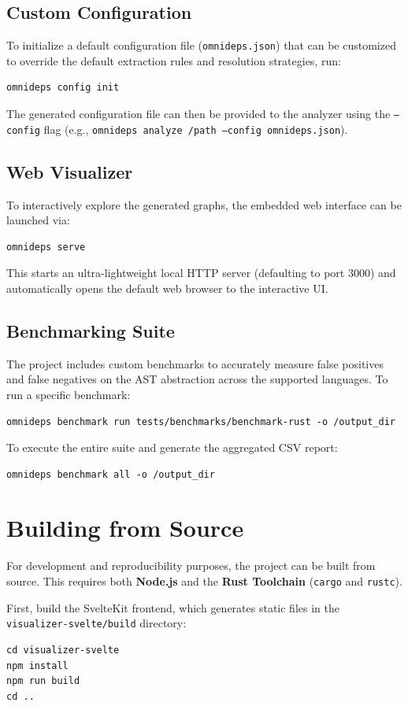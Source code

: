 \subsection*{Custom Configuration}
To initialize a default configuration file (\texttt{omnideps.json})
that can be customized to override the default extraction rules and
resolution strategies, run:
\begin{verbatim}
omnideps config init
\end{verbatim}
The generated configuration file can then be provided to the analyzer
using the \texttt{--config} flag (e.g., \texttt{omnideps analyze
/path --config omnideps.json}).

\subsection*{Web Visualizer}
To interactively explore the generated graphs, the embedded web
interface can be launched via:
\begin{verbatim}
omnideps serve
\end{verbatim}
This starts an ultra-lightweight local HTTP server (defaulting to
port 3000) and automatically opens the default web browser to the
interactive UI.

\subsection*{Benchmarking Suite}
The project includes custom benchmarks to accurately measure false
positives and false negatives on the AST abstraction across the
supported languages.
To run a specific benchmark:
\begin{verbatim}
omnideps benchmark run tests/benchmarks/benchmark-rust -o /output_dir
\end{verbatim}
To execute the entire suite and generate the aggregated CSV report:
\begin{verbatim}
omnideps benchmark all -o /output_dir
\end{verbatim}

\section{Building from Source}
For development and reproducibility purposes, the project can be
built from source. This requires both \textbf{Node.js} and the
\textbf{Rust Toolchain} (\texttt{cargo} and \texttt{rustc}).

First, build the SvelteKit frontend, which generates static files in
the \texttt{visualizer-svelte/build} directory:
\begin{verbatim}
cd visualizer-svelte
npm install
npm run build
cd ..
\end{verbatim}

